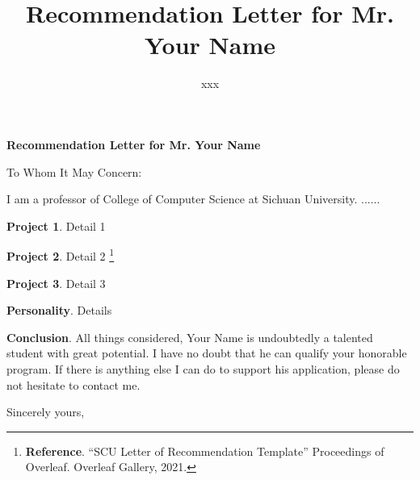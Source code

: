 \documentclass[a4paper]{letter}
\title{\bf Recommendation Letter for Mr. Your Name}
\author{xxx}
\begin{document}
\begin{letter}{\bf Recommendation Letter for Mr. Your Name}
\opening{To Whom It May Concern:}

I am a professor of College of Computer Science at Sichuan University.  ......

\textbf{Project 1}. Detail 1

\textbf{Project 2}. Detail 2 \footnote{\textbf{Reference}. ``SCU Letter of Recommendation Template'' Proceedings of Overleaf. Overleaf Gallery, 2021.}

\textbf{Project 3}. Detail 3

\textbf{Personality}. Details

\textbf{Conclusion}. All things considered, Your Name is undoubtedly a talented student with great potential. I have no doubt that he can qualify your honorable program. If there is anything else I can do to support his application, please do not hesitate to contact me.

\closing{Sincerely yours,\\
\fromsig{%
}
}

\end{letter}
\end{document}
